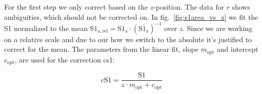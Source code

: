 For the first step we only correct based on the $ z $-position.
The data for $ r $ shows ambiguities, which should not be corrected on.
In fig.~\ref{fig:s1area_vs_z} we fit the S1 normalized to the mean $ \mathrm{S1_{a,rel}} = \mathrm{S1_a} \cdot \left( \overline{\mathrm{S1_a}} \right)^{-1} $ over $ z $.
Since we are working on a relative scale and due to our how we switch to the absolute it's justified to correct for the mean.  %
The parameters from the linear fit, slope $ m_\mathrm{opt} $ and intercept $ c_\mathrm{opt} $, are used for the correction \gls{cs1}:

\begin{equation}
    \mathrm{cS1} = \frac{ \mathrm{S1} }{ z \cdot m_\mathrm{opt} + c_\mathrm{opt} }
\end{equation}











